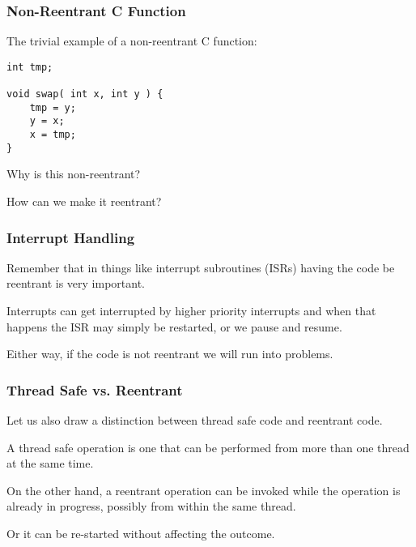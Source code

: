 \begin{frame}[fragile]
\frametitle{Non-Reentrant C Function}

The trivial example of a non-reentrant C function:

\begin{verbatim}
int tmp;

void swap( int x, int y ) {
    tmp = y;
    y = x;
    x = tmp;
}
\end{verbatim}

Why is this non-reentrant?

How can we make it reentrant?

\end{frame}



\begin{frame}
\frametitle{Interrupt Handling}


Remember that in things like interrupt subroutines (ISRs) having the code be reentrant is very important. 

Interrupts can get interrupted by higher priority interrupts and when that happens the ISR may simply be restarted, or we pause and resume.

Either way, if the code is not reentrant we will run into problems.


\end{frame}

\begin{frame}
\frametitle{Thread Safe vs. Reentrant}

Let us also draw a distinction between thread safe code and reentrant code. 

A thread safe operation is one that can be performed from more than one thread at the same time. 

On the other hand, a reentrant operation can be invoked while the operation is already in progress, possibly from within the same thread. 

Or it can be re-started without affecting the outcome. 

\end{frame}



